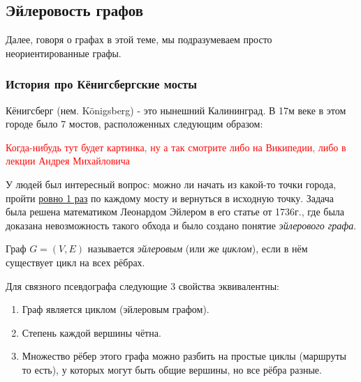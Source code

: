 \subsection*{Эйлеровость графов}

\begin{note}
	Далее, говоря о графах в этой теме, мы подразумеваем просто неориентированные графы.
\end{note}

\subsubsection*{История про Кёнигсбергские мосты}

Кёнигсберг (нем. Königsberg) - это нынешний Калининград. В 17м веке в этом городе было 7 мостов, расположенных следующим образом:

\textcolor{red}{Когда-нибудь тут будет картинка, ну а так смотрите либо на Википедии, либо в лекции Андрея Михайловича}

У людей был интересный вопрос: можно ли начать из какой-то точки города, пройти \underline{ровно 1 раз} по каждому мосту и вернуться в исходную точку. Задача была решена математиком Леонардом Эйлером в его статье от 1736г., где была доказана невозможность такого обхода и было создано понятие \textit{эйлерового графа}.

\begin{definition}
	Граф $G = (V, E)$ называется \textit{эйлеровым} (или же \textit{циклом}), если в нём существует цикл на всех рёбрах.
\end{definition}

\begin{theorem}
	Для связного псевдографа следующие 3 свойства эквивалентны:
	\begin{enumerate}
		\item Граф является циклом (эйлеровым графом).
		
		\item Степень каждой вершины чётна.
		
		\item Множество рёбер этого графа можно разбить на простые циклы (маршруты то есть), у которых могут быть общие вершины, но все рёбра разные.
	\end{enumerate}
\end{theorem}

